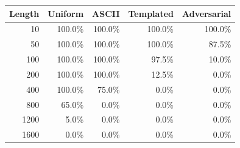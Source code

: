 \begin{tabular}{rrrrr}
\toprule
\textbf{Length} & \textbf{Uniform} & \textbf{ASCII} & \textbf{Templated} & \textbf{Adversarial} \\
\midrule
10 & 100.0\% & 100.0\% & 100.0\% & 100.0\% \\
50 & 100.0\% & 100.0\% & 100.0\% & 87.5\% \\
100 & 100.0\% & 100.0\% & 97.5\% & 10.0\% \\
200 & 100.0\% & 100.0\% & 12.5\% & 0.0\% \\
400 & 100.0\% & 75.0\% & 0.0\% & 0.0\% \\
800 & 65.0\% & 0.0\% & 0.0\% & 0.0\% \\
1200 & 5.0\% & 0.0\% & 0.0\% & 0.0\% \\
1600 & 0.0\% & 0.0\% & 0.0\% & 0.0\% \\
\bottomrule
\end{tabular}
